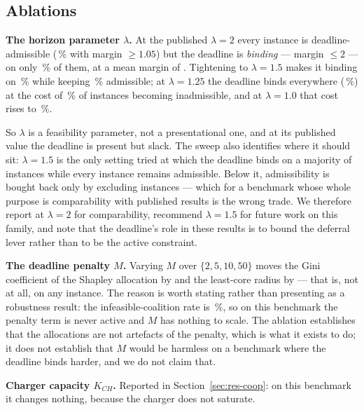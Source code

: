 \documentclass[preprint, 3p, review, 12pt]{elsarticle}
\theoremstyle{definition}
\begin{document}
\subsection{Ablations}
\label{sec:res-lambda}
\textbf{The horizon parameter $\lambda$.} At the published $\lambda=2$ every instance is
deadline-admissible (\,\% with margin $\ge1.05$) but the
deadline is \emph{binding} --- margin $\le 2$ --- on only \,\% of
them, at a mean margin of . Tightening to $\lambda=1.5$ makes
it binding on \,\% while keeping
\,\% admissible; at $\lambda=1.25$ the deadline binds
everywhere (\,\%) at the cost of
\,\% of instances becoming inadmissible, and at
$\lambda=1.0$ that cost rises to \,\%.

So $\lambda$ is a feasibility parameter, not a presentational one, and at its published value
the deadline is present but slack. The sweep also identifies where it should sit:
$\lambda=1.5$ is the only setting tried at which the deadline binds on a majority of
instances while every instance remains admissible. Below it, admissibility is bought back
only by excluding instances --- which for a benchmark whose whole purpose is comparability
with published results is the wrong trade. We therefore report at $\lambda=2$ for
comparability, recommend $\lambda=1.5$ for future work on this family, and note that the
deadline's role in these results is to bound the deferral lever rather than to be the
active constraint.

\textbf{The deadline penalty $M$.} Varying $M$ over $\{2,5,10,50\}$ moves the Gini
coefficient of the Shapley allocation by  and the
least-core radius by  --- that is, not at all, on any
instance. The reason is worth stating rather than presenting as a robustness result: the
infeasible-coalition rate is \,\%, so on this benchmark
the penalty term is never active and $M$ has nothing to scale. The ablation establishes
that the allocations are not artefacts of the penalty, which is what it exists to do; it
does not establish that $M$ would be harmless on a benchmark where the deadline binds
harder, and we do not claim that.

\textbf{Charger capacity $K_{CH}$.} Reported in Section~\ref{sec:res-coop}: on this benchmark
it changes nothing, because the charger does not saturate.
\end{document}
